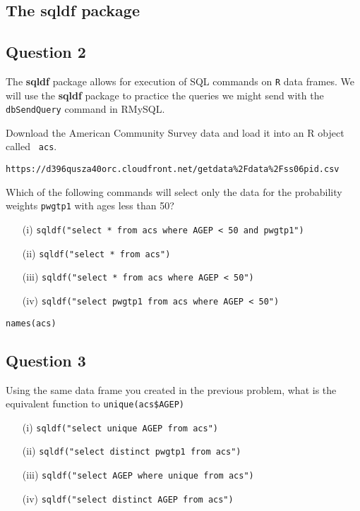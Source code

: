 \documentclass[12pt]{article}
\begin{document}
\newpage
\subsection*{The sqldf package}
\newpage
\subsection*{Question 2}
The \textbf{sqldf} package allows for execution of SQL commands on \texttt{R} data frames. We will use the \textbf{sqldf} package to practice the queries we might send with the \texttt{dbSendQuery} command in RMySQL. 

\bigskip
\noindent Download the American Community Survey data and load it into an R object called
\texttt{ acs}.

\begin{verbatim}
https://d396qusza40orc.cloudfront.net/getdata%2Fdata%2Fss06pid.csv 
\end{verbatim}

\noindent Which of the following commands will select only the data for the probability weights \texttt{pwgtp1} with ages less than 50?
\begin{itemize}
\item[(i)] \texttt{sqldf("select * from acs where AGEP < 50 and pwgtp1")}
\item[(ii)] \texttt{sqldf("select * from acs")}
\item[(iii)] \texttt{sqldf("select * from acs where AGEP < 50")}
\item[(iv)] \texttt{sqldf("select pwgtp1 from acs where AGEP < 50")}
\end{itemize}

\begin{framed}
\begin{verbatim}
names(acs)
\end{verbatim}
\end{framed}
\newpage
\subsection*{Question 3}
Using the same data frame you created in the previous problem, what is the equivalent function to \texttt{unique(acs\$AGEP)}
\begin{itemize}
\item[(i)] \texttt{sqldf("select unique AGEP from acs")}
\item[(ii)] \texttt{sqldf("select distinct pwgtp1 from acs")}
\item[(iii)] \texttt{sqldf("select AGEP where unique from acs")}
\item[(iv)] \texttt{sqldf("select distinct AGEP from acs")}
\end{itemize}
\end{document}
